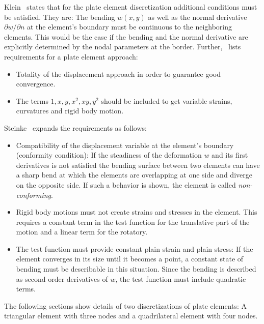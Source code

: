   Klein~\cite{klein2013fem} states that for the plate element discretization additional conditions must be satisfied. They are: The bending $w(x,y)$ as well as the normal derivative $\partial w/\partial n$ at the element's boundary must be continuous to the neighboring elements. This would be the case if the bending and the normal derivative are explicitly determined by the nodal parameters at the border. Further,~\cite{klein2013fem} lists requirements for a plate element approach:
  \begin{itemize}
  	\item Totality of the displacement approach in order to guarantee good convergence.
  	\item The terms $1, x, y, x^2, xy, y^2$ should be included to get variable strains, curvatures and rigid body motion.
  \end{itemize}
  Steinke~\cite{steinke2005finite} expands the requirements as follows:
  \begin{itemize}
  	\item Compatibility of the displacement variable at the element's boundary (conformity condition): If the steadiness of the deformation $w$ and its first derivatives is not satisfied the bending surface between two elements can have a sharp bend at which the elements are overlapping at one side and diverge on the opposite side. If such a behavior is shown, the element is called \textit{non-conforming}.
  	\item Rigid body motions must not create strains and stresses in the element. This requires a constant term in the test function for the translative part of the motion and a linear term for the rotatory.
  	\item The test function must provide constant plain strain and plain stress: If the element converges in its size until it becomes a point, a constant state of bending must be describable in this situation. Since the bending is described as second order derivatives of $w$, the test function must include quadratic terms.
  \end{itemize}
  The following sections show details of two discretizations of plate elements: A triangular element with three nodes and a quadrilateral element with four nodes.
  
